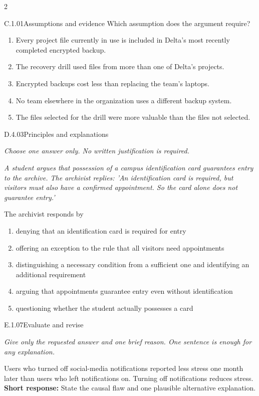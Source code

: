 \documentclass[9pt]{extarticle}
\newcommand{\choice}[1]{\item #1}
\begin{document}
\begin{multicols}{2}
\begin{DenseCoreProblem}{C.1.01}{Assumptions and evidence}
Which assumption does the argument require?
\begin{enumerate}[label=(\alph*)]
  \choice{Every project file currently in use is included in Delta's most recently completed encrypted backup.}
  \choice{The recovery drill used files from more than one of Delta's projects.}
  \choice{Encrypted backups cost less than replacing the team's laptops.}
  \choice{No team elsewhere in the organization uses a different backup system.}
  \choice{The files selected for the drill were more valuable than the files not selected.}
\end{enumerate}
\end{DenseCoreProblem}
\begin{DenseCoreProblem}{D.4.03}{Principles and explanations}
{\scriptsize\textit{Choose one answer only. No written justification is required.}\par}
\emph{A student argues that possession of a campus identification card guarantees entry to the archive. The archivist replies: 'An identification card is required, but visitors must also have a confirmed appointment. So the card alone does not guarantee entry.'}

The archivist responds by
\begin{enumerate}[label=(\alph*)]
  \choice{denying that an identification card is required for entry}
  \choice{offering an exception to the rule that all visitors need appointments}
  \choice{distinguishing a necessary condition from a sufficient one and identifying an additional requirement}
  \choice{arguing that appointments guarantee entry even without identification}
  \choice{questioning whether the student actually possesses a card}
\end{enumerate}
\end{DenseCoreProblem}
\begin{DenseCoreProblem}{E.1.07}{Evaluate and revise}
{\scriptsize\textit{Give only the requested answer and one brief reason. One sentence is enough for any explanation.}\par}
Users who turned off social-media notifications reported less stress one month later than users who left notifications on. Turning off notifications reduces stress.
\textbf{Short response:} State the causal flaw and one plausible alternative explanation.
\end{DenseCoreProblem}
\end{multicols}
\CoreWorkArea
\FormBreak
{}
\end{document}
